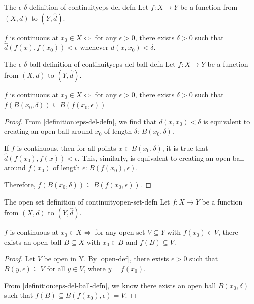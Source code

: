 \documentclass{article}
\numberwithin{equation}{section}
\numberwithin{figure}{section}
\begin{document}
\begin{definition}{The $\epsilon$-$\delta$ definition of continuity}{eps-del-defn}
    Let $f: X\to Y$ be a function from $(X,d)$ to $(Y,\hat{d})$.
    
    $f$ is continuous at $x_0 \in X \iff$ for any $\epsilon>0$, there exists $\delta>0$ such that $\hat{d}(f(x), f(x_0))<\epsilon$ whenever $d(x,x_0)<\delta$. 
\end{definition}
\begin{definition}{The $\epsilon$-$\delta$ ball definition of continuity}{eps-del-ball-defn}
    Let $f: X\to Y$ be a function from $(X,d)$ to $(Y,\hat{d})$.

    $f$ is continuous at $x_0 \in X \iff$ for any $\epsilon>0$, there exists $\delta>0$ such that $f(B(x_0,\delta))\subseteq B(f(x_0,\epsilon))$ 

    \begin{proof}
        From \cref{definition:eps-del-defn}, we find that $d(x,x_0)<\delta$ is equivalent to creating an open ball around $x_0$ of length $\delta$: $B(x_0,\delta)$. 
        
        If $f$ is continuous, then for all points $x \in B(x_0,\delta)$, it is true that $\hat{d}(f(x_0),f(x))<\epsilon$. This, similarly, is equivalent to creating an open ball around $f(x_0)$ of length $\epsilon$: $B(f(x_0), \epsilon)$.

        Therefore, $f(B(x_0,\delta))\subseteq B(f(x_0,\epsilon))$.
    \end{proof}
    
    
\end{definition}
\begin{definition}{The open set definition of continuity}{open-set-defn}
    Let $f: X\to Y$ be a function from $(X,d)$ to $(Y,\hat{d})$.

    $f$ is continuous at $x_0 \in X \iff$ for any open set $V \subseteq Y$ with $f(x_0)\in V$, there exists an open ball $B \subseteq X$ with $x_0 \in B$ and $f(B)\subseteq V$.

    \begin{proof}
        Let $V$ be open in Y. By \cref{open-def}, there exists $\epsilon>0$ such that $B(y, \epsilon)\subseteq V$ for all $y \in V$, where $y=f(x_0)$.

        From \cref{definition:eps-del-ball-defn}, we know there exists an open ball $B(x_0, \delta)$ such that $f(B) \subseteq B(f(x_0),\epsilon) = V$.
    \end{proof}
    
\end{definition}
\end{document}
